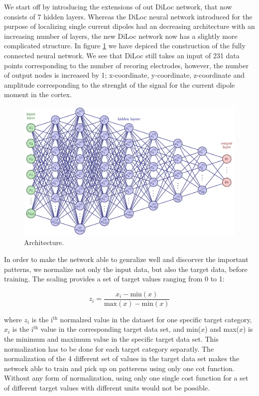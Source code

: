 \documentclass[a4paper, UKenglish, 11pt]{uiomaster}
\begin{document}
We start off by introducing the extensions of out DiLoc network, that now consists of 7 hidden layers. Whereas the DiLoc neural network introduced for the purpose of localizing single current dipoles had an decreasing architecture with an increasing number of layers, the new DiLoc network now has a slightly more complicated structure. In figure \ref{fig:NN_dipole_w_amplitude_architecture} we have depiced the construction of the fully connected neural network. We see that DiLoc still takes an input of 231 data points corresponding to the number of recoring electrodes, however, the number of output nodes is increased by 1; x-coordinate, y-coordinate, z-coordinate and amplitude corresponding to the strenght of the signal for the current dipole moment in the cortex.

\begin{figure}[!htb]
    \centering
    \includegraphics[width=\linewidth]{figures/NN_dipole_w_amplitude_architecture.pdf}
    \caption{Architecture.}
    \label{fig:NN_dipole_w_amplitude_architecture}
\end{figure}

In order to make the network able to genralize well and discorver the important patterns, we normalize not only the input data, but also the target data, before training. The scaling provides a set of target values ranging from 0 to 1:

\begin{equation}
    z_i = \frac{x_i - \text{min}(x)}{\text{max}(x) - \text{min}(x)}
    \label{eq:scale_target}
\end{equation}

where $z_i$ is the i$^{\text{th}}$ normalzed value in the dataset for one specific target category, $x_i$ is the i$^{\text{th}}$ value in the corresponding target data set, and min($x$) and max($x$) is the minimum and maximum value in the specific target data set. This normalization has to be done for each target category separatly. The normalization of the 4 different set of values in the target data set makes the network able to train and pick up on patterens using only one cot function. Without any form of normalization, using only one single cost function for a set of different target values with different units would not be possible.
\end{document}
